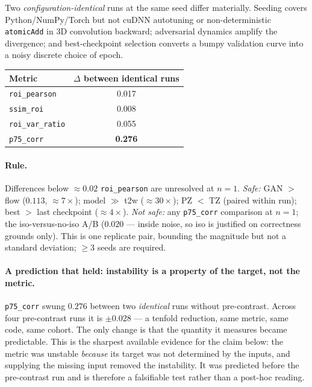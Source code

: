 \documentclass[11pt]{article}
\newcommand{\1}{\mathbb{1}}
\begin{document}
Two \emph{configuration-identical} runs at the same seed differ materially. Seeding covers
Python/NumPy/Torch but not cuDNN autotuning or non-deterministic \texttt{atomicAdd} in 3D
convolution backward; adversarial dynamics amplify the divergence; and best-checkpoint
selection converts a bumpy validation curve into a noisy discrete choice of epoch.

\begin{center}
\begin{tabular}{lc}
\toprule
Metric & $\Delta$ between identical runs \\
\midrule
\texttt{roi\_pearson} & 0.017 \\
\texttt{ssim\_roi} & 0.008 \\
\texttt{roi\_var\_ratio} & 0.055 \\
\texttt{p75\_corr} & \textbf{0.276} \\
\bottomrule
\end{tabular}
\end{center}

\paragraph{Rule.} Differences below $\approx0.02$ \texttt{roi\_pearson} are unresolved at
$n=1$. \emph{Safe:} GAN $>$ flow ($0.113$, $\approx7\times$); model $\gg$ t2w
($\approx30\times$); PZ $<$ TZ (paired within run); best $>$ last checkpoint
($\approx4\times$). \emph{Not safe:} any \texttt{p75\_corr} comparison at $n=1$; the
iso-versus-no-iso A/B ($0.020$ --- inside noise, so iso is justified on correctness grounds
only). This is one replicate pair, bounding the magnitude but not a standard deviation;
$\ge3$ seeds are required.

\paragraph{A prediction that held: instability is a property of the target, not the metric.}
\texttt{p75\_corr} swung $0.276$ between two \emph{identical} runs without pre-contrast.
Across four pre-contrast runs it is $\pm0.028$ --- a tenfold reduction, same metric, same
code, same cohort. The only change is that the quantity it measures became predictable.
This is the sharpest available evidence for the claim below: the metric was unstable
\emph{because} its target was not determined by the inputs, and supplying the missing input
removed the instability. It was predicted before the pre-contrast run and is therefore a
falsifiable test rather than a post-hoc reading.
\end{document}
